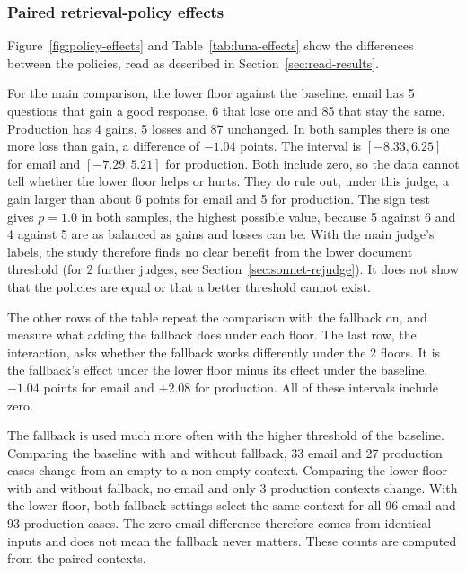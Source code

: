 \subsubsection{Paired retrieval-policy effects}
\label{sec:policy-effects}



Figure~\ref{fig:policy-effects} and Table~\ref{tab:luna-effects} show the differences between the policies, read as described in Section~\ref{sec:read-results}.

For the main comparison, the lower floor against the baseline, email has 5 questions that gain a good response, 6 that lose one and 85 that stay the same. Production has 4 gains, 5 losses and 87 unchanged. In both samples there is one more loss than gain, a difference of $-1.04$ points. The interval is $[-8.33, 6.25]$ for email and $[-7.29, 5.21]$ for production. Both include zero, so the data cannot tell whether the lower floor helps or hurts. They do rule out, under this judge, a gain larger than about 6 points for email and 5 for production. The sign test gives $p=1.0$ in both samples, the highest possible value, because 5 against 6 and 4 against 5 are as balanced as gains and losses can be. With the main judge's labels, the study therefore finds no clear benefit from the lower document threshold (for 2 further judges, see Section~\ref{sec:sonnet-rejudge}). It does not show that the policies are equal or that a better threshold cannot exist.

The other rows of the table repeat the comparison with the fallback on, and measure what adding the fallback does under each floor. The last row, the interaction, asks whether the fallback works differently under the 2 floors. It is the fallback's effect under the lower floor minus its effect under the baseline, $-1.04$ points for email and $+2.08$ for production. All of these intervals include zero.

The fallback is used much more often with the higher threshold of the baseline. Comparing the baseline with and without fallback, 33 email and 27 production cases change from an empty to a non-empty context. Comparing the lower floor with and without fallback, no email and only 3 production contexts change. With the lower floor, both fallback settings select the same context for all 96 email and 93 production cases. The zero email difference therefore comes from identical inputs and does not mean the fallback never matters. These counts are computed from the paired contexts.

